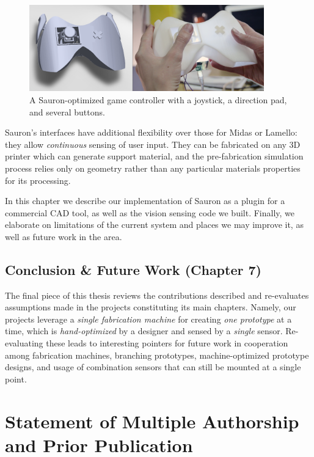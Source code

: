 \begin{figure}[h]
\centering
\includegraphics[width=4in]{figures/sauron/fig1-gamecontroller.jpg}
\caption{A Sauron-optimized game controller with a joystick, a direction pad, and several buttons.}
\label{fig:sauron-intro}
\end{figure}

Sauron's interfaces have additional flexibility over those for Midas or Lamello: they allow \emph{continuous} sensing of user input. They can be fabricated on any 3D printer which can generate support material, and the pre-fabrication simulation process relies only on geometry rather than any particular materials properties for its processing. %

In this chapter we describe our implementation of Sauron as a plugin for a commercial CAD tool, as well as the vision sensing code we built. Finally, we elaborate on limitations of the current system and places we may improve it, as well as future work in the area.

\subsection{Conclusion \& Future Work (Chapter 7)}

The final piece of this thesis reviews the contributions described and re-evaluates assumptions made in the projects constituting its main chapters. Namely, our projects leverage a \emph{single fabrication machine} for creating \emph{one prototype} at a time, which is \emph{hand-optimized} by a designer and sensed by a \emph{single} sensor. Re-evaluating these leads to interesting pointers for future work in cooperation among fabrication machines, branching prototypes, machine-optimized prototype designs, and usage of combination sensors that can still be mounted at a single point.

\section{Statement of Multiple Authorship and Prior Publication}


